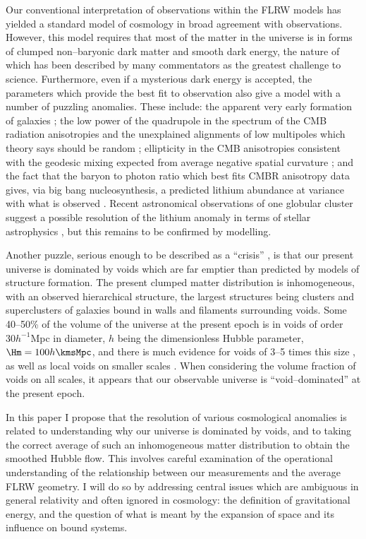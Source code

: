 \documentclass[12pt]{iopart}
\begin{document}
Our conventional interpretation of observations within the FLRW models
has yielded a standard model of cosmology in broad agreement with
observations. However, this model requires that most of the matter in
the universe is in forms of clumped non--baryonic dark matter and
smooth dark energy, the nature of which has been described by many
commentators as the greatest challenge to science. Furthermore,
even if a mysterious dark energy is accepted, the parameters which provide
the best fit to
observation also give a model with a number of puzzling anomalies. These
include: the apparent very early formation of galaxies \cite{red}; the low
power of the quadrupole in the spectrum of the CMB radiation anisotropies
and the unexplained alignments of low multipoles which theory says should be
random \cite{axis}; ellipticity in the CMB anisotropies consistent with
the geodesic mixing expected from average negative spatial curvature
\cite{elliptic2}; and the fact that the baryon to photon ratio
which best fits CMBR anisotropy data \cite{wmap} gives, via big bang
nucleosynthesis, a predicted lithium abundance at variance with what is
observed \cite{lithium}. Recent astronomical observations of one globular
cluster suggest a possible resolution of the lithium anomaly in terms of
stellar astrophysics \cite{lithium2}, but this remains to be confirmed by
modelling.

Another puzzle, serious enough to be described as a ``crisis'' \cite{P_void},
is that our present universe is dominated by
voids which are far emptier than predicted by models of structure formation.
The present clumped matter distribution is inhomogeneous, with an observed
hierarchical structure, the largest structures being clusters and
superclusters of galaxies bound in walls and filaments surrounding voids.
Some 40--50\% of the volume \cite{HV} of the universe at the present epoch
is in voids of order $30h^{-1}$Mpc in diameter, $h$ being the dimensionless
Hubble parameter, $\Hm=100h\kmsMpc$, and there is much evidence for voids
of 3--5 times this size \cite{Tom1}, as well as local voids on smaller scales
\cite{minivoids}. When
considering the volume fraction of voids on all scales, it appears that our
observable universe is ``void--dominated'' at the present epoch.

In this paper I propose that the resolution of various cosmological
anomalies is related to understanding why our universe is dominated by
voids, and to taking the correct average of such an inhomogeneous matter
distribution to obtain the smoothed Hubble flow. This involves careful
examination of the operational understanding of the relationship between
our measurements and the average FLRW geometry. I will do so by addressing
central issues which are ambiguous in general relativity and often ignored
in cosmology: the definition of gravitational energy, and the question of
what is meant by the expansion of space and its influence on bound systems.
\end{document}
